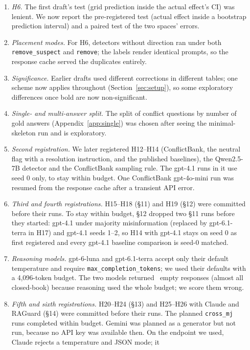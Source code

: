\begin{enumerate}[leftmargin=*,itemsep=1pt,topsep=2pt]
the addendum after the confirmatory run, so it is post hoc.
\item \emph{H6.} The first draft's test (grid prediction inside the actual effect's CI) was
lenient. We now report the pre-registered test (actual effect inside a bootstrap prediction interval) and a paired test
of the two spaces' errors.
\item \emph{Placement modes.} For H6, detectors without direction ran under both
\texttt{remove\_suspect} and \texttt{remove}; the labels render identical prompts, so the response cache served the
duplicates entirely.
\item \emph{Significance.} Earlier drafts used different corrections in different tables; one scheme now applies
throughout (Section~\ref{sec:setup}), so some exploratory differences once bold are now
non-significant.
\item \emph{Single- and multi-answer split.} The split of conflict questions by number of gold answers
(Appendix~\ref{app:single}) was chosen after seeing the minimal-skeleton run and is exploratory.
\item \emph{Second registration.} We later registered H12--H14 (ConflictBank, the neutral flag with a
resolution instruction, and the published baselines), the Qwen2.5-7B detector and the ConflictBank sampling rule.
The gpt-4.1 runs in it use seed 0 only, to stay within budget. One ConflictBank gpt-4o-mini run was resumed from the
response cache after a transient API error.
\item \emph{Third and fourth registrations.} H15--H18 (\S11) and H19 (\S12) were committed before their runs. To stay
within budget, \S12 dropped two \S11 runs before they started: gpt-4.1 under majority misinformation (replaced by
gpt-6.1-terra in H17) and gpt-4.1 seeds 1--2, so H14 with gpt-4.1 stays on seed 0 as first registered and every
gpt-4.1 baseline comparison is seed-0 matched.
\item \emph{Reasoning models.} gpt-6-luna and gpt-6.1-terra accept only their default temperature and require
\texttt{max\_completion\_tokens}; we used their defaults with a 4,096-token budget. The two models returned
\Nempty\ empty responses (almost all closed-book) because reasoning used the whole budget; we score them wrong.
\item \emph{Fifth and sixth registrations.} H20--H24 (\S13) and H25--H26 with Claude and RAGuard (\S14) were
committed before their runs. The planned \texttt{cross\_mj} runs completed within budget. Gemini was planned
as a generator but not run, because no API key was available then. On the endpoint we used, Claude rejects a temperature and JSON mode; it

\end{enumerate}
